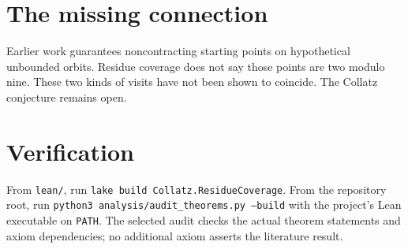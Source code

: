 \documentclass[10pt]{article}
\begin{document}
\section*{The missing connection}
Earlier work guarantees noncontracting starting points on hypothetical
unbounded orbits. Residue coverage does not say those points are two
modulo nine. These two kinds of visits have not been shown to coincide.
The Collatz conjecture remains open.

\section*{Verification}
From \texttt{lean/}, run
\texttt{lake build Collatz.ResidueCoverage}.
From the repository root, run
\texttt{python3 analysis/audit\_theorems.py --build} with
the project's Lean executable on \texttt{PATH}.
The selected audit checks the actual theorem statements and axiom
dependencies; no additional axiom asserts the literature result.
\end{document}
